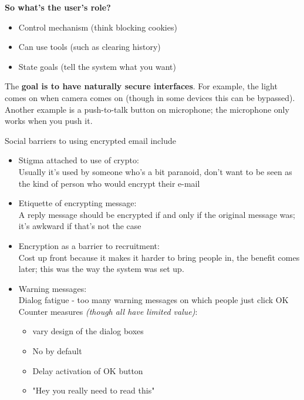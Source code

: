 \textbf{So what's the user's role?}
\begin{itemize}
	\item Control mechanism (think blocking cookies)
	\item Can use tools (such as clearing history)
	\item State goals (tell the system what you want)
\end{itemize}

The \textbf{goal is to have naturally secure interfaces}. For example, the light comes on when camera comes on (though in some devices this can be bypassed). Another example is a push-to-talk button on microphone; the microphone only works when you push it. 

Social barriers to using encrypted email include
\begin{itemize}
	\item Stigma attached to use of crypto:\\
		Usually it's used by someone who's a bit paranoid, don't want to be seen as the kind of person who would encrypt their e-mail
	\item Etiquette of encrypting message:\\
		A reply message should be encrypted if and only if the original message was; it's awkward if that's not the case
	\item Encryption as a barrier to recruitment:\\
		Cost up front because it makes it harder to bring people in, the benefit comes later; this was the way the system was set up.
	\item Warning messages:\\
		Dialog fatigue - too many warning messages on which people just click OK\\
		Counter measures \textit{(though all have limited value)}:
			\begin{itemize}
				\item vary design of the dialog boxes
				\item No by default
				\item Delay activation of OK button
				\item "Hey you really need to read this"
			\end{itemize}
\end{itemize}

